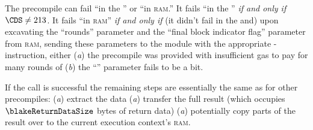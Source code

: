 The  precompile can fail ``in the \hubMod{}'' or ``in \textsc{ram}.''
It fails ``in the \hubMod{}'' \emph{if and only if} $\CDS \neq 213$.
It fails ``in \textsc{ram}''  \emph{if and only if} (it didn't fail in the \hubMod{} and) upon excavating the
``rounds''                     parameter \locBlakeR{} and the 
``final block indicator flag'' parameter \locBlakeF{}
from \textsc{ram}, sending these parameters to the \oobMod{} module with the appropriate \oobMod{}-instruction, either
(\emph{a}) the precompile was provided with insufficient gas to pay for \locBlakeR{} many rounds of 
(\emph{b}) the ``\locBlakeF{}'' parameter fails to be a bit.

If the call is successful the remaining steps are essentially the same as for other precompiles:
(\emph{a}) extract the data
(\emph{a}) transfer the full result (which occupies $\blakeReturnDataSize$ bytes of return data)
(\emph{a}) potentially copy parts of the result over to the current execution context's \textsc{ram}.
